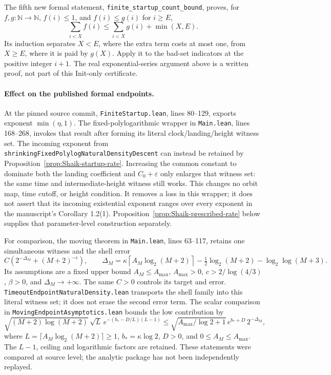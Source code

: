 The fifth new formal statement, \texttt{finite\_startup\_count\_bound},
proves, for \(f,g:\mathbb N\to\mathbb N\), \(f(i)\le1\), and
\(f(i)\le g(i)\) for \(i\ge E\),
\[
 \sum_{i<X}f(i)\le\sum_{i<X}g(i)+\min(X,E).
\]
Its induction separates \(X<E\), where the extra term costs at most one,
from \(X\ge E\), where it is paid by \(g(X)\).
Apply it to the bad-set indicators at the positive integer \(i+1\).
The real exponential-series argument above is a written proof, not
part of this Init-only certificate.

\paragraph{Effect on the published formal endpoints.}
At the pinned source commit,
\texttt{FiniteStartup.lean}, lines 80--129, exports exponent
\(\min(\eta,1)\).
The fixed-polylogarithmic wrapper in \texttt{Main.lean},
lines 168--268, invokes that result after forming its literal
clock/landing/height witness set.
The incoming exponent from
\texttt{shrinkingFixedPolylogNaturalDensityDescent} can instead be
retained by Proposition~\ref{prop:Shaik-startup-rate}.
Increasing the common constant to dominate both the landing coefficient
and \(C_0+\varepsilon\) only enlarges that witness set:
the same time and intermediate-height witness still works.
This changes no orbit map, time cutoff, or height condition.
It removes a loss in this wrapper; it does not assert that its
incoming existential exponent ranges over every exponent in the
manuscript's Corollary 1.2(1). Proposition~\ref{prop:Shaik-prescribed-rate}
below supplies that parameter-level construction separately.

For comparison, the moving theorem in \texttt{Main.lean}, lines 63--117,
retains one simultaneous witness and the shell error
\[
 C\left(2^{-\Delta_M}+(M+2)^{-\epsilon}\right),\qquad
 \Delta_M=\kappa\left\lceil A_M\log_2(M+2)\right\rceil
 -\tfrac12\log_2(M+2)-\log_2\log(M+3).
\]
Its assumptions are a fixed upper bound \(A_M\le A_{\max}\),
\(A_{\max}>0\), \(c>2/\log(4/3)\), \(\beta>0\), and
\(\Delta_M\to+\infty\). The same \(C>0\) controls its target and error.
\texttt{TimeoutEndpointNaturalDensity.lean} transports the shell
family into this literal witness set; it does not erase the second
error term. The scalar comparison in
\texttt{MovingEndpointAsymptotics.lean} bounds the low contribution by
\[
 \sqrt{(M+2)\log(M+2)}\,\sqrt L\,
 e^{-(b_*-D/L)(L-1)}
 \le
 \sqrt{A_{\max}/\log2+1}\,e^{b_*+D}\,2^{-\Delta_M},
\]
where \(L=\lceil A_M\log_2(M+2)\rceil\ge1\),
\(b_*=\kappa\log2\), \(D>0\), and \(0\le A_M\le A_{\max}\).
The \(L-1\), ceiling and logarithmic factors are retained.
These statements were compared at source level; the analytic package
has not been independently replayed.

